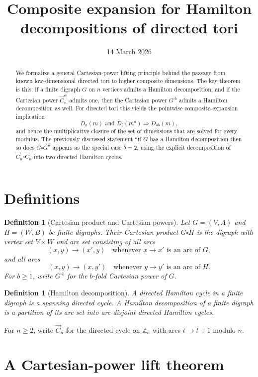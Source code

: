 \documentclass[11pt]{article}
\title{Composite expansion for Hamilton decompositions of directed tori}
\author{}
\date{14 March 2026}
\newtheorem{definition}[theorem]{Definition}
\newcommand{\Cdir}{\vec C}
\newcommand{\torus}[2]{D_{#1}(#2)}
\begin{document}
\maketitle

\begin{abstract}
We formalize a general Cartesian-power lifting principle behind the passage from
known low-dimensional directed tori to higher composite dimensions.
The key theorem is this: if a finite digraph $G$ on $n$ vertices admits a
Hamilton decomposition, and if the Cartesian power $\Cdir_n^{\square b}$ admits
one, then the Cartesian power $G^{\square b}$ admits a Hamilton decomposition as
well.
For directed tori this yields the pointwise composite-expansion implication
\[
\torus{a}{m}\text{ and }\torus{b}{m^a}
\Longrightarrow
\torus{ab}{m},
\]
and hence the multiplicative closure of the set of dimensions that are solved
for every modulus.
The previously discussed statement ``if $G$ has a Hamilton decomposition then so
does $G\square G$'' appears as the special case $b=2$, using the explicit
decomposition of $\Cdir_n\square\Cdir_n$ into two directed Hamilton cycles.
\end{abstract}

\section{Definitions}

\begin{definition}[Cartesian product and Cartesian powers]
Let $G=(V,A)$ and $H=(W,B)$ be finite digraphs.
Their \emph{Cartesian product} $G\square H$ is the digraph with vertex set
$V\times W$ and arc set consisting of all arcs
\[
(x,y)\to(x',y) \quad\text{whenever } x\to x'\text{ is an arc of }G,
\]
and all arcs
\[
(x,y)\to(x,y') \quad\text{whenever } y\to y'\text{ is an arc of }H.
\]
For $b\ge 1$, write $G^{\square b}$ for the $b$-fold Cartesian power of $G$.
\end{definition}

\begin{definition}[Hamilton decomposition]
A \emph{directed Hamilton cycle} in a finite digraph is a spanning directed
cycle.
A \emph{Hamilton decomposition} of a finite digraph is a partition of its arc
set into arc-disjoint directed Hamilton cycles.
\end{definition}

For $n\ge 2$, write $\Cdir_n$ for the directed cycle on $\mathbb Z_n$ with arcs
$t\to t+1$ modulo $n$.

\section{A Cartesian-power lift theorem}
\end{document}
